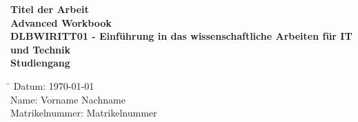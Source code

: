 \documentclass[11pt]{article}
\begin{document}
\begin{titlepage}
    \begin{center}
        \vspace*{2cm}

        {\LARGE \textbf{Titel der Arbeit}}\\[1.5cm] %
        
        {\large \textbf{Advanced Workbook}}\\[1.5cm] %

        \textbf{DLBWIRITT01 - Einführung in das wissenschaftliche Arbeiten für IT und Technik}\\[0.5cm] %

        \textbf{Studiengang}\\[1.5cm] %

        \begin{tabbing}
            \hspace*{4cm}\=\kill
            Datum: \> \today \\[0.5cm] %
            Name: \> Vorname Nachname\\[0.5cm] %
            Matrikelnummer: \> Matrikelnummer \\[0.5cm] %
        \end{tabbing}

        \vfill

    \end{center}
\end{titlepage}
\tableofcontents
\newpage
{}
\end{document}
